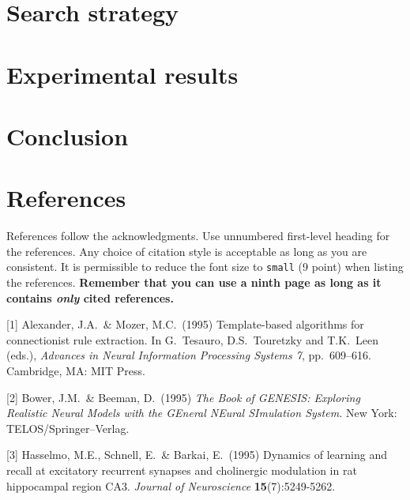 \documentclass{article}
\begin{document}
\section{Search strategy}




\section{Experimental results}

% 


\section{Conclusion}



\section*{References}

References follow the acknowledgments. Use unnumbered first-level
heading for the references. Any choice of citation style is acceptable
as long as you are consistent. It is permissible to reduce the font
size to \verb+small+ (9 point) when listing the references. {\bf
  Remember that you can use a ninth page as long as it contains
  \emph{only} cited references.}
\medskip

\small

[1] Alexander, J.A.\ \& Mozer, M.C.\ (1995) Template-based algorithms
for connectionist rule extraction. In G.\ Tesauro, D.S.\ Touretzky and
T.K.\ Leen (eds.), {\it Advances in Neural Information Processing
  Systems 7}, pp.\ 609--616. Cambridge, MA: MIT Press.

[2] Bower, J.M.\ \& Beeman, D.\ (1995) {\it The Book of GENESIS:
  Exploring Realistic Neural Models with the GEneral NEural SImulation
  System.}  New York: TELOS/Springer--Verlag.

[3] Hasselmo, M.E., Schnell, E.\ \& Barkai, E.\ (1995) Dynamics of
learning and recall at excitatory recurrent synapses and cholinergic
modulation in rat hippocampal region CA3. {\it Journal of
  Neuroscience} {\bf 15}(7):5249-5262.
\end{document}
